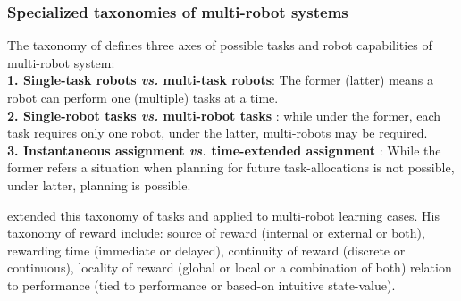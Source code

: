 \subsubsection*{Specialized taxonomies of multi-robot systems} 
The taxonomy of  defines three axes of possible tasks and robot capabilities of multi-robot system:\\
\textbf{1. Single-task robots  {\em vs.} multi-task robots}: The former (latter) means a robot can perform one (multiple) tasks at a time.\\
\textbf{2. Single-robot tasks  {\em vs.} multi-robot tasks }: while under the former, each task requires only one robot, under the latter, multi-robots may be required.\\
\textbf{3. Instantaneous assignment {\em vs.} time-extended assignment }: While the former refers a situation when planning for future task-allocations is not possible, under latter, planning is possible.

 extended this taxonomy of tasks and applied to multi-robot learning cases. His taxonomy of reward include: source of reward (internal or external or both), rewarding time (immediate or delayed), continuity of reward (discrete or continuous), locality of reward (global or local or a combination of both) relation to performance (tied to performance or based-on intuitive state-value).
